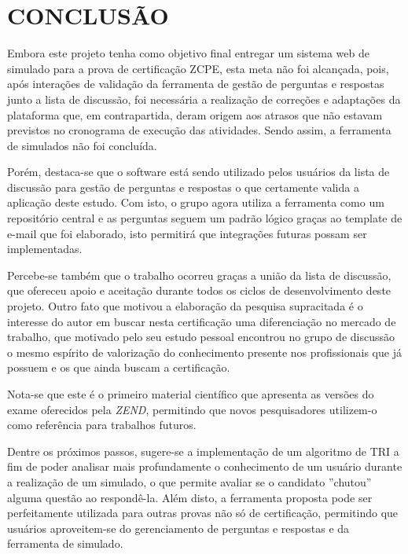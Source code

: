 \chapter{CONCLUSÃO}
\label{chp:conclusao}

Embora este projeto tenha como objetivo final entregar um sistema web de simulado
para a prova de certificação \acs{ZCPE}, esta meta não foi alcançada, pois, 
após interações de validação da ferramenta de gestão de perguntas e
respostas junto a lista de discussão, foi necessária a realização de correções e
adaptações da plataforma que, em contrapartida, deram origem aos atrasos que não
estavam previstos no cronograma de execução das atividades. Sendo assim, a
ferramenta de simulados não foi concluída.

Porém, destaca-se que o software está sendo utilizado pelos usuários da lista
de discussão para gestão de perguntas e respostas o que certamente valida a
aplicação deste estudo. Com isto, o grupo agora utiliza a ferramenta como um
repositório central e as perguntas seguem um padrão lógico graças ao template de
e-mail que foi elaborado, isto permitirá que integrações futuras possam ser
implementadas.

Percebe-se também que o trabalho ocorreu graças a união da lista de discussão,
que ofereceu apoio e aceitação durante todos os ciclos de desenvolvimento deste
projeto. Outro fato que motivou a elaboração da pesquisa supracitada é o
interesse do autor em buscar nesta certificação uma diferenciação no mercado de trabalho,
que motivado pelo seu estudo pessoal encontrou no grupo de discussão o mesmo
espírito de valorização do conhecimento presente nos profissionais que já
possuem e os que ainda buscam a certificação.

Nota-se que este é o primeiro material científico que apresenta as versões do
exame oferecidos pela \textit{ZEND}, permitindo que novos pesquisadores 
utilizem-o como referência para trabalhos futuros.

Dentre os próximos passos, sugere-se a implementação de um algoritmo de \ac{TRI}
a fim de poder analisar mais profundamente o conhecimento de um usuário durante a
realização de um simulado, o que permite avaliar se o candidato ''chutou''
alguma questão ao respondê-la. Além disto, a ferramenta proposta pode ser
perfeitamente utilizada para outras provas não só de certificação, permitindo
que usuários aproveitem-se do gerenciamento de perguntas e respostas e da 
ferramenta de simulado.